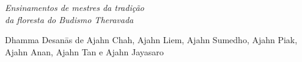 
\cleartorecto
\thispagestyle{empty}
\vspace*{5em}
\newlength\titleLength
\newlength\xheight

{\centering

\settowidth{\titleLength}{%
  {\Large\chapterTitleFont\scshape\MakeLowercase{\thetitle}}%
}

{\Large\chapterTitleFont\scshape\MakeLowercase{\thetitle}}\\[0.3\baselineskip]
\raisebox{0.5\xheight}{\color[gray]{0.4}\rule{\titleLength}{0.1pt}}\\[0.3\baselineskip]
{\itshape
Ensinamentos de mestres da tradição\\
da floresta do Budismo Theravada}

\vfill

Dhamma Desanās de Ajahn Chah, Ajahn Liem, Ajahn Sumedho, Ajahn Piak,
Ajahn Anan, Ajahn Tan e Ajahn Jayasaro

\vspace*{5em}

}


